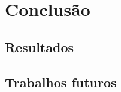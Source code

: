 \chapter[Conclusão]{Conclusão}

\section[Resultados]{Resultados}

\section[Trabalhos futuros]{Trabalhos futuros}

